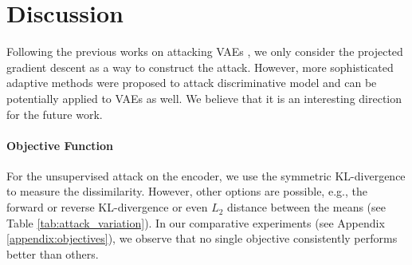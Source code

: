\newpage










\section{Discussion}
Following the previous works on attacking VAEs \cite{barrett2021certifiably, camuto2021towards, cemgil2020autoencoding, Cemgil2019-vn, Gondim-Ribeiro2018-cu, Willetts2019-mu}, we only consider the projected gradient descent as a way to construct the attack. However, more sophisticated adaptive methods \cite{ athalye2018obfuscated, tramer2020adaptive} were proposed to attack discriminative model and can be potentially applied to VAEs as well.
We believe that it is an interesting direction for the future work. 

\paragraph{Objective Function}
For the unsupervised attack on the encoder, we use the symmetric KL-divergence to measure the dissimilarity. However, other options are possible, e.g., the forward or reverse KL-divergence or even $L_2$ distance between the means (see Table \ref{tab:attack_variation}). In our comparative experiments (see Appendix \ref{appendix:objectives}), we observe that no single objective consistently performs better than others.


